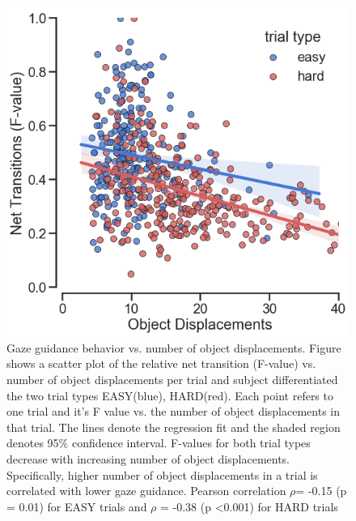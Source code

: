 \begin{figure}[h]
    \centering
    \includegraphics[width=0.3\linewidth]{source/figures/results/gaze_guidance_v_grasps_planning.png}
    \caption[]{Gaze guidance behavior vs. number of object displacements. Figure shows a scatter plot of the relative net transition (F-value) vs. number of object displacements per trial and subject differentiated the two trial types EASY(blue), HARD(red). Each point refers to one trial and it's F value vs. the number of object displacements in that trial. The lines denote the regression fit and the shaded region denotes 95\% confidence interval. F-values for both trial types decrease with increasing number of object displacements. Specifically, higher number of object displacements in a trial is correlated with lower gaze guidance. Pearson correlation $\rho$= -0.15 (p = 0.01) for EASY trials and $\rho$ = -0.38 (p <0.001) for HARD trials\\
    }
    \label{figure:F_value_plan}
\end{figure}